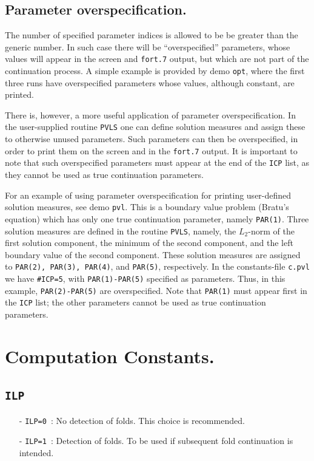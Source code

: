 \documentclass[12pt]{report}
\begin{document}
\subsection{ Parameter overspecification.} \label{sec:Parameter_over_specification}
The number of specified parameter indices is allowed to be be greater 
than the generic number.
In such case there will be ``overspecified'' parameters, whose values
will appear in the screen and {\tt fort.7} output, but which are not
part of the continuation process.
A simple example is provided by demo {\tt opt}, where the first three runs
have overspecified parameters whose values, although constant, are printed.

There is, however, a more useful application of parameter overspecification.
In the user-supplied routine {\tt PVLS} one can define solution measures
and assign these to otherwise unused parameters.
Such parameters can then be overspecified, in order to print them
on the screen and in the {\tt fort.7} output.
It is important to note that such overspecified parameters must appear
at the end of the {\tt ICP} list, as they cannot be used as true continuation
parameters.

For an example of using parameter overspecification for printing user-defined
solution measures, see demo {\tt pvl}.
This is a boundary value problem (Bratu's equation) which has
only one true continuation parameter, namely {\tt PAR(1)}.
Three solution measures are defined in the routine {\tt PVLS}, namely,
the $L_2$-norm of the first solution component,
the minimum of the second component, and
the left boundary value of the second component.
These solution measures are assigned to {\tt PAR(2), PAR(3), PAR(4)},
and {\tt PAR(5)}, respectively.
In the constants-file {\tt c.pvl} we have {\tt \#ICP=5},
with {\tt PAR(1)-PAR(5)} specified as parameters.
Thus, in this example, {\tt PAR(2)-PAR(5)} are overspecified.
Note that {\tt PAR(1)} must appear first in the {\tt ICP} list;
the other parameters cannot be used as true continuation parameters.
\section{ Computation Constants.} \label{sec:Computation_constants}
\subsection{\tt ILP}  \label{sec:ILP}
\begin{itemize}
\item[-] {\tt ILP=0}~: 
  No detection of folds. This choice is recommended.
\item[-] {\tt ILP=1}~: 
  Detection of folds. To be used if subsequent fold continuation is intended.
\end{itemize}
\end{document}
